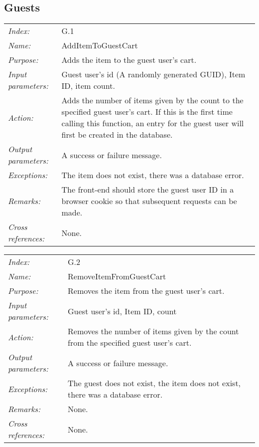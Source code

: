 \documentclass[10pt,letter]{article}
\begin{document}
\subsection{Guests}

\begin{tabularx}{\textwidth}{l X}
    \it{Index:} & G.1 \\
    \it{Name:} & AddItemToGuestCart \\
    \it{Purpose:} & Adds the item to the guest user's cart. \\
    \it{Input parameters:} & Guest user's id (A randomly generated GUID), Item ID, item count. \\
    \it{Action:} & Adds the number of items given by the count to the specified guest user's cart. If this is the first time calling this function, 
    an entry for the guest user will first be created in the database.\\
    \it{Output parameters:} & A success or failure message. \\
    \it{Exceptions:} & The item does not exist, there was a database error. \\
    \it{Remarks:} & The front-end should store the guest user ID in a browser cookie so that subsequent requests can be made. \\
    \it{Cross references:} & None. \\
    \hline
\end{tabularx}

\begin{tabularx}{\textwidth}{l X}
    \it{Index:} & G.2 \\
    \it{Name:} & RemoveItemFromGuestCart \\
    \it{Purpose:} & Removes the item from the guest user's cart. \\
    \it{Input parameters:} & Guest user's id, Item ID, count \\
    \it{Action:} & Removes the number of items given by the count from the specified guest user's cart. \\
    \it{Output parameters:} & A success or failure message. \\
    \it{Exceptions:} & The guest does not exist, the item does not exist, there was a database error. \\
    \it{Remarks:} & None. \\
    \it{Cross references:} & None. \\
    \hline
\end{tabularx}
\end{document}
